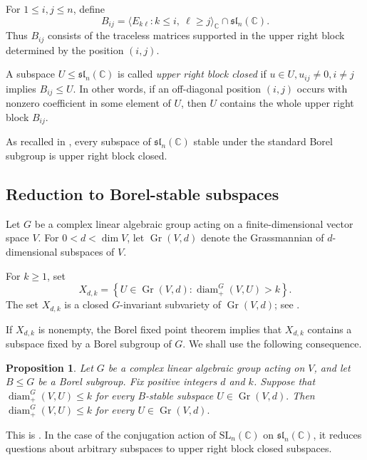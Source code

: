 \documentclass[11pt]{article}
\newtheorem{proposition}[theorem]{Proposition}
\theoremstyle{remark}
\newcommand{\C}{\mathbb C}
\begin{document}
For $1\leq i,j\leq n$, define
\[
 B_{ij}
 =
\langle E_{k\ell}:k\leq i,\ \ell\geq j \rangle_{\mathbb C}
 \cap\mathfrak{sl}_n(\C).
\]
Thus $B_{ij}$ consists of the traceless matrices supported in the upper
right block determined by the position $(i,j)$.

A subspace $U\leq\mathfrak{sl}_n(\C)$
is called \emph{upper right block closed} if $u\in U, u_{ij}\neq0,
 i\neq j$
implies $B_{ij}\leq U.$
In other words, if an off-diagonal position $(i,j)$ occurs with nonzero
coefficient in some element of $U$, then $U$ contains the whole upper
right block $B_{ij}$.

As recalled in \cite[Section~2.2.2]{JezernikSpenko}, every subspace of
$\mathfrak{sl}_n(\C)$ stable under the standard Borel subgroup is
upper right block closed.


\subsection{Reduction to Borel-stable subspaces}

Let $G$ be a complex linear algebraic group acting on a finite-dimensional
vector space $V$.  For $0<d<\dim V$, let $\operatorname{Gr}(V,d)$
denote the Grassmannian of $d$-dimensional subspaces of $V$.

For $k\geq1$, set
\[
 X_{d,k}
 =
 \left\{
 U\in\operatorname{Gr}(V,d):
 \operatorname{diam}^{G}_{+}(V,U)>k
 \right\}.
\]
The set $X_{d,k}$ is a closed $G$-invariant subvariety of
$\operatorname{Gr}(V,d)$; see
\cite[Section~2.1]{JezernikSpenko}.

If $X_{d,k}$ is nonempty, the Borel fixed point theorem implies that
$X_{d,k}$ contains a subspace fixed by a Borel subgroup of $G$.  We shall
use the following consequence.

\begin{proposition}\label{prop:borelreduction}
Let $G$ be a complex linear algebraic group acting on $V$, and let
$B\leq G$ be a Borel subgroup.  Fix positive integers $d$ and $k$.
Suppose that $\operatorname{diam}^{G}_{+}(V,U)\leq k$
for every $B$-stable subspace $U\in\operatorname{Gr}(V,d).$
Then $\operatorname{diam}^{G}_{+}(V,U)\leq k$
for every $U\in\operatorname{Gr}(V,d).$
\end{proposition}

This is \cite[Proposition~2.3]{JezernikSpenko}.  In the case of the
conjugation action of $\mathrm{SL}_n(\C)$ on $\mathfrak{sl}_n(\C)$,
it reduces questions about arbitrary subspaces to upper right block
closed subspaces.
\end{document}

